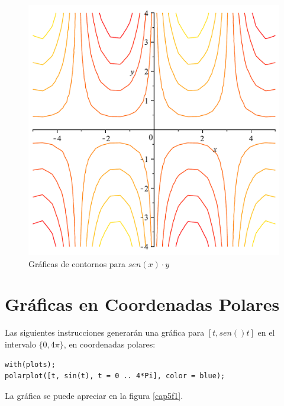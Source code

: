 \documentclass[letterpaper,12pt]{book}
\begin{document}
\begin{figure}[h!]
\centering
\includegraphics[scale=0.35]{grafica06.pdf}
\caption{Gráficas de contornos para $sen(x) \cdot y$}\label{cap4f1}
\end{figure}


\chapter{Gráficas en Coordenadas Polares}

Las siguientes instrucciones generarán una gráfica para 
$[t, sen()t]$ en el intervalo $\{0, 4\pi\}$, en coordenadas polares:

\begin{verbatim}
with(plots);
polarplot([t, sin(t), t = 0 .. 4*Pi], color = blue);
\end{verbatim}

La gráfica se puede apreciar en la figura \ref{cap5f1}.
\end{document}
